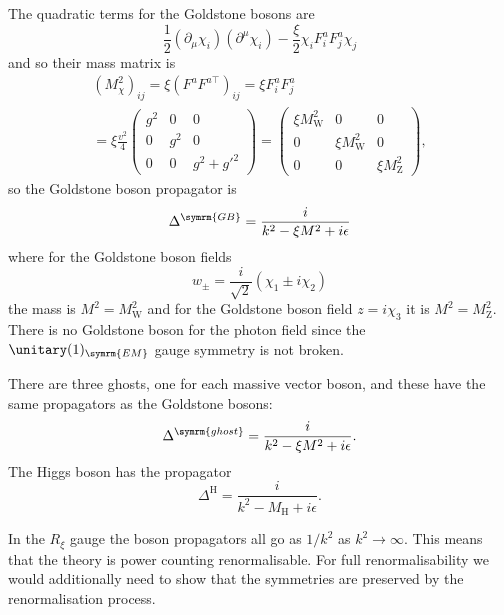 \documentclass[fleqn]{NotesClass}
\newcommand{\Pparticle}[1]{\mathrm{#1}}
\newcommand{\PZ}{\ensuremath{\Pparticle{Z}}}
\newcommand{\PW}{\ensuremath{\Pparticle{W}}}
\newcommand{\Phiggs}{\ensuremath{\Pparticle{H}}}
\newcommand{\trans}{\top}
\begin{document}
    The quadratic terms for the Goldstone bosons are
    \begin{equation}
        \frac{1}{2}(\partial_\mu \chi_i)(\partial^\mu \chi_i) - \frac{\xi}{2} \chi_i F^a_i F^a_j \chi_j
    \end{equation}
    and so their mass matrix is
    \begin{multline}
        (M_\chi^2)_{ij} = \xi(F^a F^{a\trans})_{ij} = \xi F^a_i F^a_j\\
        = \xi \frac{v^2}{4}
        \begin{pmatrix}
            g^2 & 0 & 0\\
            0 & g^2 & 0\\
            0 & 0 & g^2 + g'^2
        \end{pmatrix}
        =
        \begin{pmatrix}
            \xi M_{\PW}^2 & 0 & 0\\
            0 & \xi M_{\PW}^2 & 0\\
            0 & 0 & \xi M_{\PZ}^2
        \end{pmatrix}
        ,
    \end{multline}
    so the Goldstone boson propagator is
    \begin{equation}
        \Delta^{\symrm{GB}} = \frac{i}{k^2 - \xi M^2 + i\epsilon}
    \end{equation}
    where for the Goldstone boson fields
    \begin{equation}
        w_{\pm} = \frac{i}{\sqrt{2}}(\chi_1 \pm i \chi_2)
    \end{equation}
    the mass is \(M^2 = M_{\PW}^2\) and for the Goldstone boson field \(z = i\chi_3\) it is \(M^2 = M_{\PZ}^2\).
    There is no Goldstone boson for the photon field since the \(\unitary(1)_{\symrm{EM}}\) gauge symmetry is not broken.
    
    There are three ghosts, one for each massive vector boson, and these have the same propagators as the Goldstone bosons:
    \begin{equation}
        \Delta^{\symrm{ghost}} = \frac{i}{k^2 - \xi M^2 + i\epsilon}.
    \end{equation}
    The Higgs boson has the propagator
    \begin{equation}
        \Delta^{\Phiggs} = \frac{i}{k^2 - M_{\Phiggs} + i\epsilon}.
    \end{equation}
    
    In the \(R_\xi\) gauge the boson propagators all go as \(1/k^2\) as \(k^2 \to \infty\).
    This means that the theory is power counting renormalisable.
    For full renormalisability we would additionally need to show that the symmetries are preserved by the renormalisation process.
    
\end{document}
